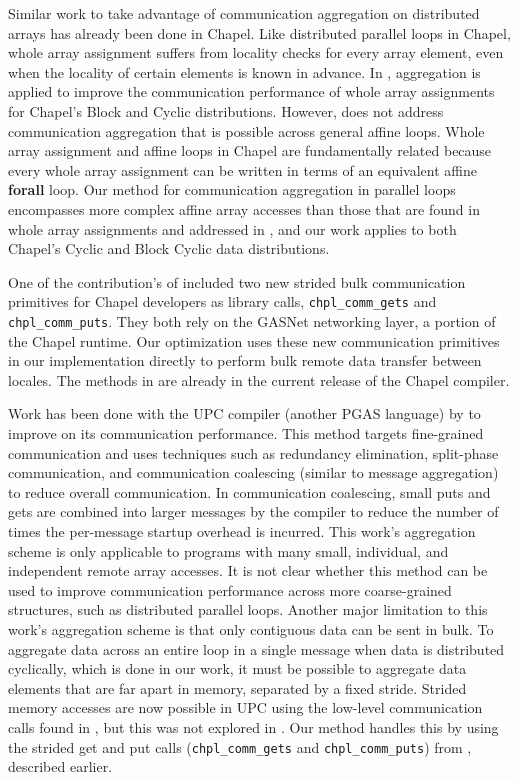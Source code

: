 Similar work to take advantage of communication aggregation on distributed arrays has already been done in Chapel. Like distributed parallel loops in Chapel, whole array assignment suffers from locality checks for every array element, even when the locality of certain elements is known in advance. In \cite{sanz2012global}, aggregation is applied to improve the communication performance of whole array assignments for Chapel's Block and Cyclic distributions. However, \cite{sanz2012global} does not address communication aggregation that is possible across general affine loops. Whole array assignment and affine loops in Chapel are fundamentally related because every whole array assignment can be written in terms of an equivalent affine \textbf{forall} loop. Our method for communication aggregation in parallel loops encompasses more complex affine array accesses than those that are found in whole array assignments and addressed in \cite{sanz2012global}, and our work applies to both Chapel's Cyclic and Block Cyclic data distributions.  

One of the contribution's of \cite{sanz2012global} included two new strided bulk communication primitives for Chapel developers as library calls, \texttt{chpl\_comm\_gets} and \texttt{chpl\_comm\_puts}. They both rely on the GASNet networking layer, a portion of the Chapel runtime.  Our optimization uses these new communication primitives in our implementation directly to perform bulk remote data transfer between locales. The methods in \cite{sanz2012global} are already in the current release of the Chapel compiler. 

Work has been done with the UPC compiler (another PGAS language) by \cite{chen2005communication} to improve on its communication performance. This method targets fine-grained communication and uses techniques such as redundancy elimination, split-phase communication, and communication coalescing (similar to message aggregation) to reduce overall communication. In communication coalescing, small puts and gets are combined into larger messages by the compiler to reduce the number of times the per-message startup overhead is incurred. This work's aggregation scheme is only applicable to programs with many small, individual, and independent remote array accesses. It is not clear whether this method can be used to improve communication performance across more coarse-grained structures, such as distributed parallel loops. Another major limitation to this work's aggregation scheme is that only contiguous data can be sent in bulk. To aggregate data across an entire loop in a single message when data is distributed cyclically, which is done in our work, it must be possible to aggregate data elements that are far apart in memory, separated by a fixed stride. Strided memory accesses are now possible in UPC using the low-level communication calls found in \cite{bonachea2007proposal}, but this was not explored in \cite{chen2005communication}. Our method handles this by using the strided get and put calls (\texttt{chpl\_comm\_gets} and \texttt{chpl\_comm\_puts}) from \cite{sanz2012global}, described earlier. 

